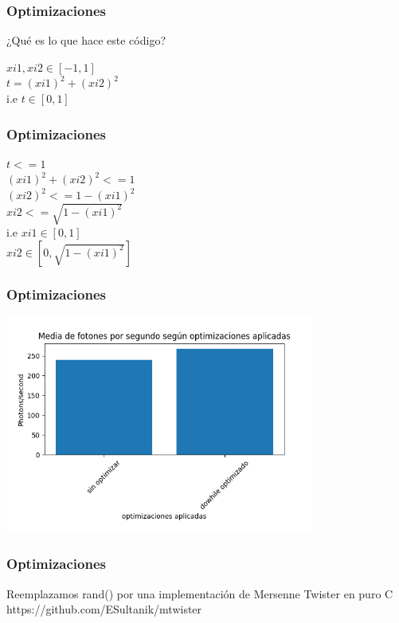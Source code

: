 \documentclass{beamer}
\begin{document}
\begin{frame}
    \frametitle{Optimizaciones}
    ¿Qué es lo que hace este código? \\ \pause
    \begin{center}
        $xi1, xi2  \in [-1, 1] $ \\ \pause
        $t = (xi1)^2 + (xi2)^2$ \\ \pause
        i.e $ t \in [0,1]$
    
    \end{center}

\end{frame}


\begin{frame}
    \frametitle{Optimizaciones}
    \begin{center}
        $ t <= 1 $ \\\pause
        $(xi1)^2 + (xi2)^2 <= 1$ \\\pause
        $(xi2)^2 <= 1 - (xi1)^2$ \\\pause
        $xi2 <= \sqrt{1 - (xi1)^2}$\\\pause
        i.e $xi1 \in [0, 1]$\\
        $xi2 \in [0, \sqrt{1 - (xi1)^2}]$    

    \end{center}

\end{frame}

\begin{frame}
    \frametitle{Optimizaciones}

    \includegraphics[width=4in]{imagenes/optimizaciones_1.png}
\end{frame}

\begin{frame}
    \frametitle{Optimizaciones}
        Reemplazamos rand() por una implementación de Mersenne Twister en puro C\\\pause
        https://github.com/ESultanik/mtwister
\end{frame}
\end{document}
